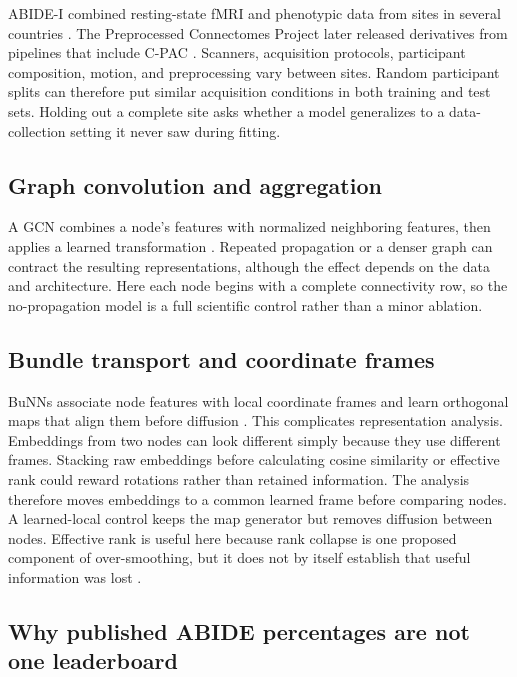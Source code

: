 \documentclass[11pt,a4paper]{article}
\begin{document}
ABIDE-I combined resting-state fMRI and phenotypic data from sites in several
countries \cite{dimartino2014abide}. The Preprocessed Connectomes Project later
released derivatives from pipelines that include C-PAC \cite{abidepcp}.
Scanners, acquisition protocols, participant composition, motion, and
preprocessing vary between sites. Random participant splits can therefore put
similar acquisition conditions in both training and test sets. Holding out a
complete site asks whether a model generalizes to a data-collection setting it
never saw during fitting.

\subsection{Graph convolution and aggregation}

A GCN combines a node's features with normalized neighboring features, then
applies a learned transformation \cite{kipf2017gcn}. Repeated propagation or a
denser graph can contract the resulting representations, although the effect
depends on the data and architecture. Here each node begins with a complete
connectivity row, so the no-propagation model is a full scientific control
rather than a minor ablation.

\subsection{Bundle transport and coordinate frames}

BuNNs associate node features with local coordinate frames and learn
orthogonal maps that align them before diffusion \cite{bamberger2025bundle}.
This complicates representation analysis. Embeddings from two nodes can look
different simply because they use different frames. Stacking raw embeddings
before calculating cosine similarity or effective rank could reward rotations
rather than retained information. The analysis therefore moves embeddings to
a common learned frame before comparing nodes. A learned-local control keeps
the map generator but removes diffusion between nodes. Effective rank is useful
here because rank collapse is one proposed component of over-smoothing, but it
does not by itself establish that useful information was lost
\cite{roth2024rank}.

\subsection{Why published ABIDE percentages are not one leaderboard}
\end{document}
